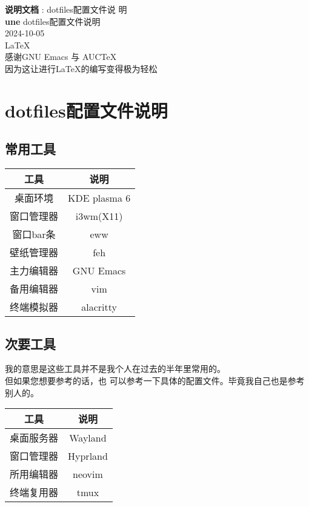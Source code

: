 \documentclass[11pt]{article}
\date{\today}
\title{}
\begin{document}
\begin{titlepage}
  \begin{center}
    \vspace*{1cm} \textbf{说明文档} \vspace{0.5cm} : dotfiles配置文件说
    明\vspace{1.5cm} \\ \textbf{une} \vfill dotfiles配置文件说明\vspace{0.8cm}
    \\ 2024-10-05 \\ \LaTeX \\ \vspace{0.6cm} 感谢GNU Emacs 与 AUCTeX \\ 因为这让进行\LaTeX{}的编写变得极为轻松
  \end{center}
\end{titlepage}

\tableofcontents

\newpage{}
\section{dotfiles配置文件说明}

\subsection{常用工具}
\begin{center}
  \begin{tabular}{|c|c|}
    \hline
    工具 & 说明 \\
    \hline
    桌面环境 & KDE plasma 6 \\ 
    窗口管理器 & i3wm(X11) \\
    窗口bar条 & eww \\
    壁纸管理器 & feh \\  
    主力编辑器 & GNU Emacs \\
    备用编辑器 & vim \\
    终端模拟器 & alacritty \\
    \hline
  \end{tabular}
\end{center}

\subsection{次要工具}
我的意思是这些工具并不是我个人在过去的半年里常用的。 \\ 但如果您想要参考的话，也
可以参考一下具体的配置文件。毕竟我自己也是参考别人的。
\begin{center}
  \begin{tabular}{|c|c|}
    \hline
    工具 & 说明 \\
    \hline  
    桌面服务器 & Wayland \\
    窗口管理器 & Hyprland \\
    所用编辑器 & neovim \\
    终端复用器 & tmux \\ 
    \hline
  \end{tabular}  
\end{center}
\end{document}
